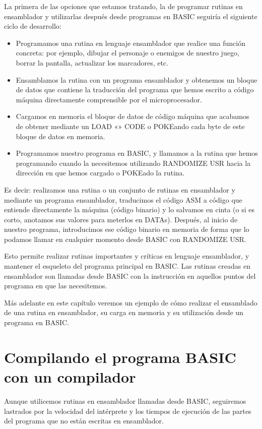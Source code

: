 \documentclass[letterpaper,10pt,spanish]{sphinxmanual}
\begin{document}
La primera de las opciones que estamos tratando, la de programar rutinas en ensamblador y utilizarlas después desde programas en BASIC seguiría el siguiente ciclo de desarrollo:
\begin{itemize}
\item {} 
Programamos una rutina en lenguaje ensamblador que realice una función concreta: por ejemplo, dibujar el personaje o enemigos de nuestro juego, borrar la pantalla, actualizar los marcadores, etc.

\item {} 
Ensamblamos la rutina con un programa ensamblador y obtenemos un bloque de datos que contiene la traducción del programa que hemos escrito a código máquina directamente comprensible por el microprocesador.

\item {} 
Cargamos en memoria el bloque de datos de código máquina que acabamos de obtener mediante un LOAD «» CODE o POKEando cada byte de este bloque de datos en memoria.

\item {} 
Programamos nuestro programa en BASIC, y llamamos a la rutina que hemos programando cuando la necesitemos utilizando RANDOMIZE USR hacia la dirección en que hemos cargado o POKEado la rutina.

\end{itemize}

Es decir: realizamos una rutina o un conjunto de rutinas en ensamblador y mediante un programa ensamblador, traducimos el código ASM a código que entiende directamente la máquina (código binario) y lo salvamos en cinta (o si es corto, anotamos sus valores para meterlos en DATAs). Después, al inicio de nuestro programa, introducimos ese código binario en memoria de forma que lo podamos llamar en cualquier momento desde BASIC con RANDOMIZE USR.

Esto permite realizar rutinas importantes y críticas en lenguaje ensamblador, y mantener el esqueleto del programa principal en BASIC. Las rutinas creadas en ensamblador son llamadas desde BASIC con la instrucción  en aquellos puntos del programa en que las necesitemos.

Más adelante en este capítulo veremos un ejemplo de cómo realizar el ensamblado de una rutina en ensamblador, su carga en memoria y su utilización desde un programa en BASIC.


\section{Compilando el programa BASIC con un compilador}
\label{\detokenize{02_introduccion/introduccion:compilando-el-programa-basic-con-un-compilador}}
Aunque utilicemos rutinas en ensamblador llamadas desde BASIC, seguiremos lastrados por la velocidad del intérprete y los tiempos de ejecución de las partes del programa que no están escritas en ensamblador.
\end{document}
